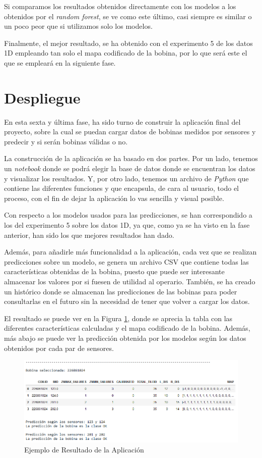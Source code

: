 Si comparamos los resultados obtenidos directamente con los modelos a los obtenidos por el \emph{random forest}, se ve como este último, casi siempre es similar o un poco peor que si utilizamos solo los modelos.

Finalmente, el mejor resultado, se ha obtenido con el experimento 5 de los datos 1D empleando tan solo el mapa codificado de la bobina, por lo que será este el que se empleará en la siguiente fase. 

\section{Despliegue}
En esta sexta y última fase, ha sido turno de construir la aplicación final del proyecto, sobre la cual se puedan cargar datos de bobinas medidos por sensores y predecir y si serán bobinas válidas o no. 

La construcción de la aplicación se ha basado en dos partes. Por un lado, tenemos un \emph{notebook} donde se podrá elegir la base de datos donde se encuentran los datos y visualizar los resultados. Y, por otro lado, tenemos un archivo de \emph{Python} que contiene las diferentes funciones y que encapsula, de cara al usuario, todo el proceso, con el fin de dejar la aplicación lo vas sencilla y visual posible. 

Con respecto a los modelos usados para las predicciones, se han correspondido a los del experimento 5 sobre los datos 1D, ya que, como ya se ha visto en la fase anterior, han sido los que mejores resultados han dado. 

Además, para añadirle más funcionalidad a la aplicación, cada vez que se realizan predicciones sobre un modelo, se genera un archivo CSV que contiene todas las características obtenidas de la bobina, puesto que puede ser interesante almacenar los valores por si fuesen de utilidad al operario. También, se ha creado un histórico donde se almacenan las predicciones de las bobinas para poder consultarlas en el futuro sin la necesidad de tener que volver a cargar los datos.

El resultado se puede ver en la Figura \ref{f:apli1}, donde se aprecia la tabla con las diferentes características calculadas y el mapa codificado de la bobina. Además, más abajo se puede ver la predicción obtenida por los modelos según los datos obtenidos por cada par de sensores.

\begin{figure}[h]
 \centering
  \includegraphics[width=1\textwidth]{img/salidaAp.PNG}
 \caption{Ejemplo de Resultado de la Aplicación}
 \label{f:apli1}
\end{figure}

